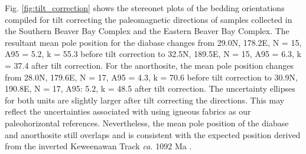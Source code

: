 Fig. \ref{fig:tilt_correction} shows the stereonet plots of the bedding orientations compiled for tilt correcting the paleomagnetic directions of samples collected in the Southern Beaver Bay Complex and the Eastern Beaver Bay Complex. The resultant mean pole position for the diabase changes from 29.0\textdegree N, 178.2\textdegree E, N = 15, A95 = 5.2\textdegree, k = 55.3 before tilt correction to 32.5\textdegree N, 189.5\textdegree E, N = 15, A95 = 6.3\textdegree, k = 37.4 after tilt correction. For the anorthosite, the mean pole position changes from 28.0\textdegree N, 179.6\textdegree E, N = 17, A95 = 4.3\textdegree, k = 70.6 before tilt correction to 30.9\textdegree N, 190.8\textdegree E, N = 17, A95: 5.2\textdegree, k = 48.5 after tilt correction. The uncertainty ellipses for both units are slightly larger after tilt correcting the directions. This may reflect the uncertainties associated with using igneous fabrics as our paleohorizontal references. Nevertheless, the mean pole position of the diabase and anorthosite still overlaps and is consistent with the expected position derived from the inverted Keweenawan Track \textit{ca.} 1092 Ma \citep{Swanson-Hysell2019a}. 


\clearpage


\clearpage


\nocite{Mattinson2005a, Condon2015a, Schmitz2007a, Jaffe1975a}

\clearpage

